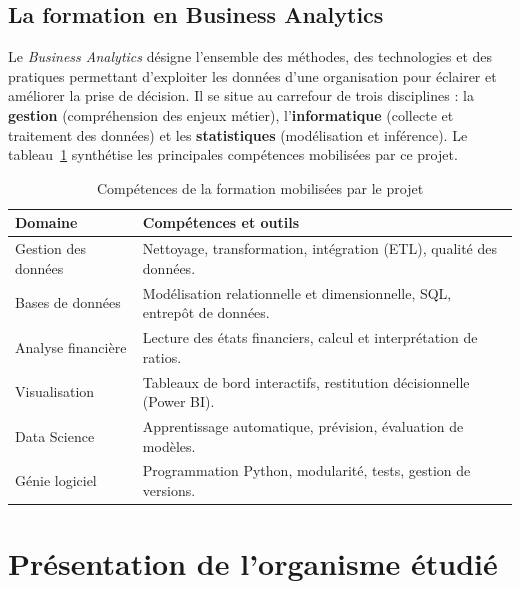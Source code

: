 \subsection{La formation en Business Analytics}
\par Le \textit{Business Analytics} désigne l'ensemble des méthodes, des
technologies et des pratiques permettant d'exploiter les données d'une
organisation pour éclairer et améliorer la prise de décision. Il se situe au
carrefour de trois disciplines : la \textbf{gestion} (compréhension des enjeux
métier), l'\textbf{informatique} (collecte et traitement des données) et les
\textbf{statistiques} (modélisation et inférence). Le tableau~\ref{tab:competences}
synthétise les principales compétences mobilisées par ce projet.

\begin{table}[H]
  \centering
  \caption[Compétences mobilisées par le projet]{Compétences de la formation mobilisées par le projet}
  \label{tab:competences}
  \begin{tabular}{|p{4cm}|p{9.5cm}|}
    \hline
    \textbf{Domaine} & \textbf{Compétences et outils} \\ \hline
    Gestion des données & Nettoyage, transformation, intégration (ETL), qualité des données. \\ \hline
    Bases de données & Modélisation relationnelle et dimensionnelle, SQL, entrepôt de données. \\ \hline
    Analyse financière & Lecture des états financiers, calcul et interprétation de ratios. \\ \hline
    Visualisation & Tableaux de bord interactifs, restitution décisionnelle (Power BI). \\ \hline
    Data Science & Apprentissage automatique, prévision, évaluation de modèles. \\ \hline
    Génie logiciel & Programmation Python, modularité, tests, gestion de versions. \\ \hline
  \end{tabular}
\end{table}

\section{Présentation de l'organisme étudié}
\label{sec:sfbt}

